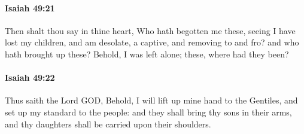 		\paragraph{Isaiah 49:21} %
			\label{ISAIAH-49-21}

			Then shalt thou say in thine heart, Who hath begotten me these, seeing I have lost my children, and am desolate, a captive, and removing to and fro? and who hath brought up these? Behold, I was left alone; these, where had they been?


		\paragraph{Isaiah 49:22} %
			\label{ISAIAH-49-22}

			Thus saith the Lord GOD, Behold, I will lift up mine hand to the Gentiles, and set up my standard to the people: and they shall bring thy sons in their arms, and thy daughters shall be carried upon their shoulders.

